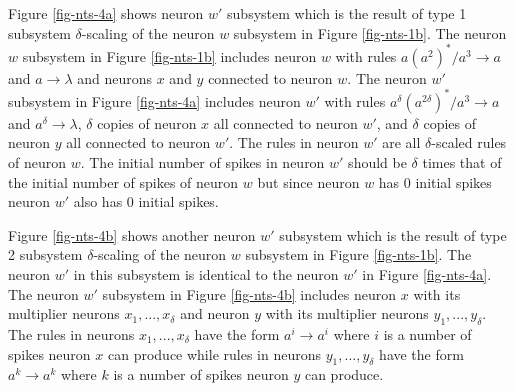 \documentclass[]{elsarticle}
\theoremstyle{definition}
\theoremstyle{definition}
\newcommand{\ra}{\rightarrow}
\begin{document}
Figure \ref{fig-nts-4a} shows neuron $w'$ subsystem which is the result of type 1 subsystem 
$\delta$-scaling of the neuron $w$ subsystem in Figure \ref{fig-nts-1b}. The neuron $w$ subsystem
in Figure \ref{fig-nts-1b} includes neuron $w$ with rules $a(a^2)^*/a^3\ra a$ and $a \ra\lambda$ and
neurons $x$ and $y$ connected to neuron $w$. The neuron $w'$ subsystem in Figure \ref{fig-nts-4a} 
includes neuron $w'$ with rules $a^{\delta}(a^{2\delta})^*/a^3\ra a$ and $a^{\delta}\ra \lambda$, 
$\delta$ copies of neuron $x$ all connected to neuron $w'$, and $\delta$ copies of neuron $y$ all
connected to neuron $w'$. The rules in neuron $w'$ are all $\delta$-scaled rules of neuron $w$. The 
initial number of spikes in neuron $w'$ should be $\delta$ times that of the initial number of 
spikes of neuron $w$ but since neuron $w$ has $0$ initial spikes neuron $w'$ also has $0$ initial 
spikes.

Figure \ref{fig-nts-4b} shows another neuron $w'$ subsystem which is the result of type 2 subsystem
$\delta$-scaling of the neuron $w$ subsystem in Figure \ref{fig-nts-1b}. The neuron $w'$ in this
subsystem is identical to the neuron $w'$ in Figure \ref{fig-nts-4a}. The neuron $w'$ subsystem
in Figure \ref{fig-nts-4b} includes neuron $x$ with its multiplier neurons $x_1,...,x_\delta$ and
neuron $y$ with its multiplier neurons $y_1,...,y_\delta$. The rules in neurons $x_1,...,x_\delta$ 
have the form $a^i \ra a^i$ where $i$ is a number of spikes neuron $x$ can produce while rules
in neurons $y_1,...,y_\delta$ have the form $a^k\ra a^k$ where $k$ is a number of spikes neuron $y$
can produce.

\end{document}
